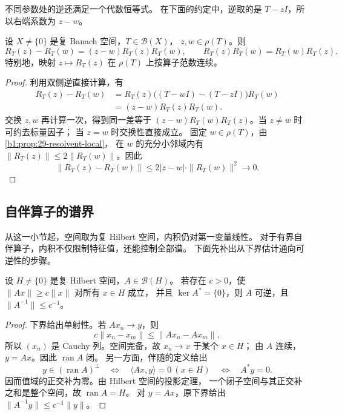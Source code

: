 不同参数处的逆还满足一个代数恒等式。
在下面的约定中，逆取的是 \(T-zI\)，所以右端系数为 \(z-w\)。

\begin{proposition}[预解恒等式]
\label{b1:prop:29-resolvent-identity}
设 \(X\ne\{0\}\) 是复 Banach 空间，\(T\in\mathcal B(X)\)，
\(z,w\in\rho(T)\)。则
\[
 R_T(z)-R_T(w)=(z-w)R_T(z)R_T(w),\qquad
 R_T(z)R_T(w)=R_T(w)R_T(z).
\]
特别地，映射 \(z\mapsto R_T(z)\) 在 \(\rho(T)\) 上按算子范数连续。
\end{proposition}

\begin{proof}
利用双侧逆直接计算，有
\[
 \begin{aligned}
 R_T(z)-R_T(w)
 &=R_T(z)\bigl((T-wI)-(T-zI)\bigr)R_T(w)\\
 &=(z-w)R_T(z)R_T(w).
 \end{aligned}
\]
交换 \(z,w\) 再计算一次，得到同一差等于
\((z-w)R_T(w)R_T(z)\)。当 \(z\ne w\) 时可约去标量因子；
当 \(z=w\) 时交换性直接成立。
固定 \(w\in\rho(T)\)，由\cref{b1:prop:29-resolvent-local}，
在 \(w\) 的充分小邻域内有 \(\|R_T(z)\|\leq2\|R_T(w)\|\)。因此
\[
 \|R_T(z)-R_T(w)\|
 \leq2|z-w|\cdot\|R_T(w)\|^2\longrightarrow0.
\]
\end{proof}

\subsection{自伴算子的谱界}
\label{b1:subsec:290103}

从这一小节起，空间取为复 Hilbert 空间，内积仍对第一变量线性。
对于有界自伴算子，内积不仅限制特征值，还能控制全部谱。
下面先补出从下界估计通向可逆性的步骤。

\begin{lemma}[下界与伴随核]
\label{b1:lem:29-invertibility}
设 \(H\ne\{0\}\) 是复 Hilbert 空间，\(A\in\mathcal B(H)\)。
若存在 \(c>0\)，使 \(\|Ax\|\geq c\|x\|\) 对所有 \(x\in H\) 成立，
并且 \(\ker A^*=\{0\}\)，则 \(A\) 可逆，且 \(\|A^{-1}\|\leq c^{-1}\)。
\end{lemma}

\begin{proof}
下界给出单射性。若 \(Ax_n\to y\)，则
\[
 c\|x_n-x_m\|\leq\|Ax_n-Ax_m\|,
\]
所以 \((x_n)\) 是 Cauchy 列。空间完备，故 \(x_n\to x\) 于某个 \(x\in H\)；
由 \(A\) 连续，\(y=Ax\)。因此 \(\operatorname{ran}A\) 闭。
另一方面，伴随的定义给出
\[
 y\in(\operatorname{ran}A)^\perp
 \quad\Longleftrightarrow\quad
 \langle Ax,y\rangle=0\ (x\in H)
 \quad\Longleftrightarrow\quad A^*y=0.
\]
因而值域的正交补为零。由 Hilbert 空间的投影定理，
一个闭子空间与其正交补之和是整个空间，故 \(\operatorname{ran}A=H\)。
对 \(y=Ax\)，原下界给出 \(\|A^{-1}y\|\leq c^{-1}\|y\|\)。
\end{proof}

